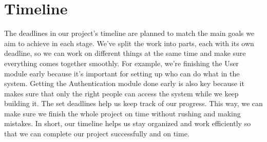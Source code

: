 \documentclass[12pt, titlepage]{article}
\begin{document}
\section{Timeline}

The deadlines in our project's timeline are planned to match the main goals we aim to achieve in each stage. We've split the work into parts, each with its own deadline, so we can work on different things at the same time and make sure everything comes together smoothly. For example, we're finishing the User module early because it's important for setting up who can do what in the system. Getting the Authentication module done early is also key because it makes sure that only the right people can access the system while we keep building it. The set deadlines help us keep track of our progress. This way, we can make sure we finish the whole project on time without rushing and making mistakes. In short, our timeline helps us stay organized and work efficiently so that we can complete our project successfully and on time.
\\
\end{document}

